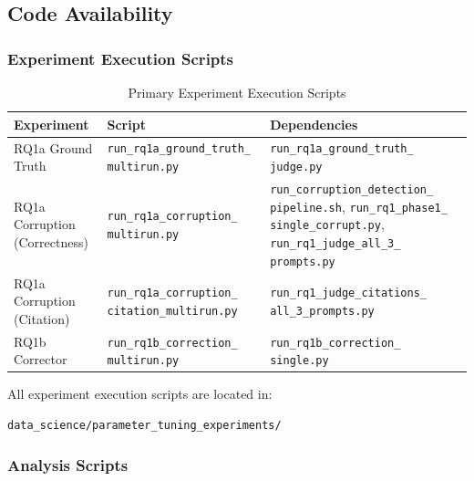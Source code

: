 \documentclass{article}
\begin{document}
\subsection{Code Availability}
\label{sec:code_availability}

\subsubsection{Experiment Execution Scripts}

\begin{table}[H]
\centering
\caption{Primary Experiment Execution Scripts}
\label{tab:exec_scripts}
\begin{tabular}{p{3cm}p{5cm}p{5cm}}
\toprule
\textbf{Experiment} & \textbf{Script} & \textbf{Dependencies} \\
\midrule
RQ1a Ground Truth & \texttt{run\_rq1a\_ground\_truth\_} \texttt{multirun.py} & \texttt{run\_rq1a\_ground\_truth\_} \texttt{judge.py} \\
\addlinespace
RQ1a Corruption (Correctness) & \texttt{run\_rq1a\_corruption\_} \texttt{multirun.py} & \texttt{run\_corruption\_detection\_} \texttt{pipeline.sh}, \texttt{run\_rq1\_phase1\_} \texttt{single\_corrupt.py}, \texttt{run\_rq1\_judge\_all\_3\_} \texttt{prompts.py} \\
\addlinespace
RQ1a Corruption (Citation) & \texttt{run\_rq1a\_corruption\_} \texttt{citation\_multirun.py} & \texttt{run\_rq1\_judge\_citations\_} \texttt{all\_3\_prompts.py} \\
\addlinespace
RQ1b Corrector & \texttt{run\_rq1b\_correction\_} \texttt{multirun.py} & \texttt{run\_rq1b\_correction\_} \texttt{single.py} \\
\bottomrule
\end{tabular}
\end{table}

All experiment execution scripts are located in:
\begin{verbatim}
data_science/parameter_tuning_experiments/
\end{verbatim}

\subsubsection{Analysis Scripts}
\end{document}
